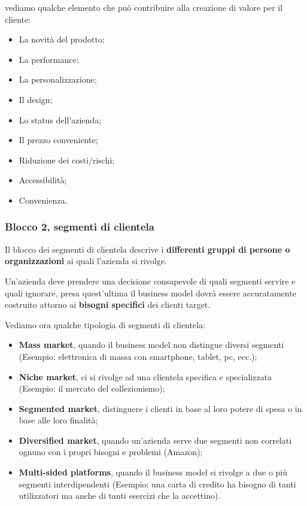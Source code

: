 \documentclass[14pt]{extarticle}
\begin{document}
vediamo qualche elemento che può contribuire alla creazione di valore per il
cliente:

\begin{itemize}
    \item La novità del prodotto;
    \item La performance;
    \item La personalizzazione;
    \item Il design;
    \item Lo status dell'azienda;
    \item Il prezzo conveniente;
    \item Riduzione dei costi/rischi;
    \item Accessibilità;
    \item Convenienza.
\end{itemize}

\subsubsection{Blocco 2, segmenti di clientela}

Il blocco dei segmenti di clientela descrive i \textbf{differenti gruppi di
persone o organizzazioni} ai quali l'azienda si rivolge.

Un'azienda deve prendere una decisione consapevole di quali segmenti servire e
quali ignorare, presa quest'ultima il business model dovrà essere accuratamente
costruito attorno ai \textbf{bisogni specifici} dei clienti target.

Vediamo ora qualche tipologia di segmenti di clientela:

\begin{itemize}
    \item \textbf{Mass market}, quando il business model non distingue diversi
    segmenti (Esempio: elettronica di massa con smartphone, tablet, pc, ecc.);
    \item \textbf{Niche market}, ci si rivolge ad una clientela specifica e
    specializzata (Esempio: il mercato del collezionismo);
    \item \textbf{Segmented market}, distinguere i clienti in base al loro
    potere di spesa o in base alle loro finalità;
    \item \textbf{Diversified market}, quando un'azienda serve due segmenti non
    correlati ognuno con i propri bisogni e problemi (Amazon);
    \item \textbf{Multi-sided platforms}, quando il business model si rivolge a
    due o più segmenti interdipendenti (Esempio: una carta di credito ha bisogno
    di tanti utilizzatori ma anche di tanti esercizi che la accettino).    
\end{itemize}
\end{document}
